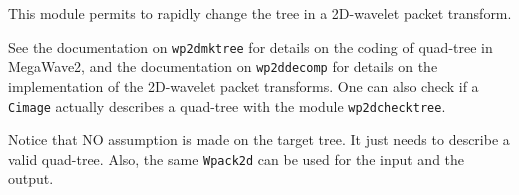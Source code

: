 This module permits to rapidly  change the tree in a 2D-wavelet packet
transform. 

See the documentation on \verb+wp2dmktree+ for details on the coding of
quad-tree in MegaWave2, and the documentation on \verb+wp2ddecomp+
for details on the implementation of the 2D-wavelet packet transforms.
One can also check if a \verb+Cimage+ actually
describes a quad-tree with the module \verb+wp2dchecktree+.

Notice that NO assumption is made on the target tree. It just needs to
describe a valid quad-tree.
Also, the same \verb+Wpack2d+ can be used for the input and the output.